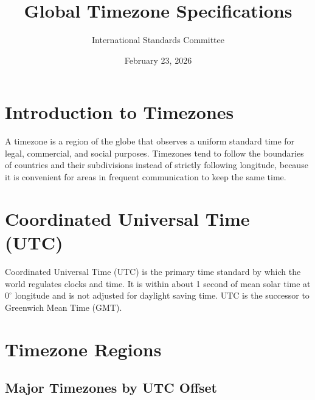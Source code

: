 \documentclass[12pt]{article}
\title{Global Timezone Specifications}
\author{International Standards Committee}
\date{February 23, 2026}
\begin{document}
\maketitle

\section{Introduction to Timezones}

A timezone is a region of the globe that observes a uniform standard time for legal, commercial, and social purposes. Timezones tend to follow the boundaries of countries and their subdivisions instead of strictly following longitude, because it is convenient for areas in frequent communication to keep the same time.

\section{Coordinated Universal Time (UTC)}

Coordinated Universal Time (UTC) is the primary time standard by which the world regulates clocks and time. It is within about 1 second of mean solar time at $0^{\circ}$ longitude and is not adjusted for daylight saving time. UTC is the successor to Greenwich Mean Time (GMT).

\section{Timezone Regions}

\subsection{Major Timezones by UTC Offset}
\end{document}
